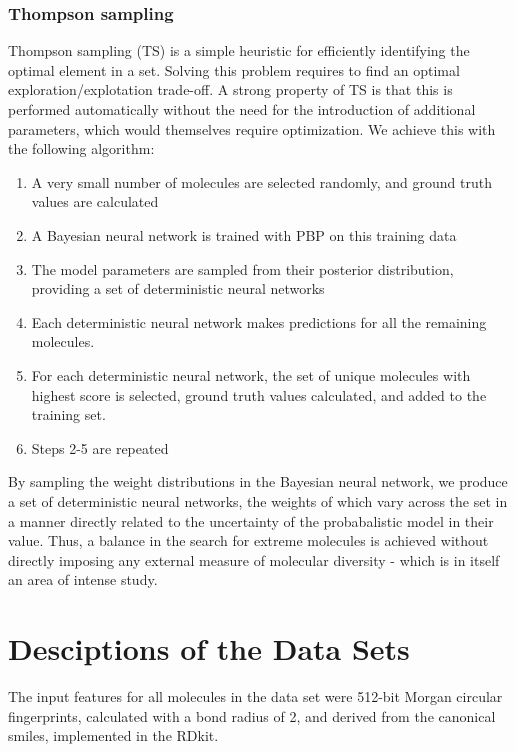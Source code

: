 \documentclass{pnastwo}
\begin{document}
\begin{article}
\subsubsection{Thompson sampling}

Thompson sampling (TS) \cite{thompson_likelihood_1933} is a simple heuristic for efficiently identifying the optimal element in a set. Solving this problem
requires to find an optimal exploration/explotation trade-off. A strong property of TS  is that this is performed automatically without the need for the introduction of additional parameters, which would themselves require optimization. 
We achieve this with the following algorithm:
\begin{enumerate}
\item A very small number of molecules are selected randomly, and ground truth values are calculated
\item A Bayesian neural network is trained with PBP on this training data
\item The model parameters are sampled from their posterior distribution, providing a set of deterministic neural networks
\item Each deterministic neural network makes predictions for all the remaining molecules. 
\item For each deterministic neural network, the set of unique molecules with highest score is selected,  ground truth values calculated, and added to the training set.
\item Steps 2-5 are repeated
\end{enumerate}
By sampling the weight distributions in the Bayesian neural network, we produce a set of deterministic neural networks, the weights of which vary across the set in a manner directly related to the uncertainty of the probabalistic model in their value.  Thus, a balance in the search for extreme molecules is achieved without directly imposing any external measure of molecular diversity - which is in itself an area of intense study\cite{Maldonado_2006}.
  
  

\section{Desciptions of the Data Sets}
The input features for all molecules in the data set were 512-bit Morgan circular fingerprints\cite{Rogers_2010}, calculated with a bond radius of 2, and derived from the canonical smiles, implemented in the RDkit\cite{rdkit}.


\end{article}
\end{document}
